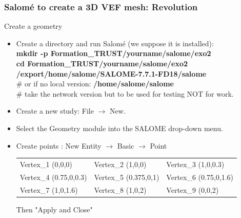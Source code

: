 \documentclass[10pt, hyperref={unicode=true,pdfusetitle, bookmarks=true,bookmarksnumbered=false,bookmarksopen=false, breaklinks=false,pdfborder={0 0 1},backref=true,colorlinks=true,linkcolor=darkblue,pageanchor}]{beamer}
\begin{document}
\begin{frame}
\frametitle{Salom\'e to create a 3D VEF mesh: Revolution}
\begin{block}{Create a geometry}

\begin{itemize}
\item Create a directory and run Salom\'e (we suppose it is installed):\\
\textbf{mkdir -p Formation\_TRUST/yourname/salome/exo2} \\
\textbf{cd Formation\_TRUST/yourname/salome/exo2} \\

\textbf{/export/home/salome/SALOME-7.7.1-FD18/salome} \\
\# or if no local version: {\scriptsize{\textbf{/home/salome/salome}}} \\
\# take the network version but to be used for testing NOT for work.

\item Create a new study: File $\rightarrow$ New.

\item Select the Geometry module into the SALOME drop-down menu.

\item Create points : New Entity $\rightarrow$ Basic $\rightarrow$ Point\\
\begin{tabular}{lll}
Vertex\_1 (0,0,0)       &   Vertex\_2 (1,0,0)       &   Vertex\_3 (1,0,0.3) \tabularnewline
Vertex\_4 (0.75,0,0.3)  &   Vertex\_5 (0.375,0,1)   &   Vertex\_6 (0.75,0,1.6) \tabularnewline
Vertex\_7 (1,0,1.6)     &   Vertex\_8 (1,0,2)       &   Vertex\_9 (0,0,2) \tabularnewline
\end{tabular}

Then "Apply and Close"

\end{itemize}

\end{block}
\end{frame}
\end{document}
